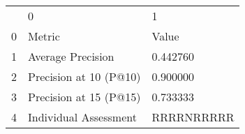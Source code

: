 \begin{tabular}{lll}
 & 0 & 1 \\
0 & Metric & Value \\
1 & Average Precision & 0.442760 \\
2 & Precision at 10 (P@10) & 0.900000 \\
3 & Precision at 15 (P@15) & 0.733333 \\
4 & Individual Assessment & RRRRNRRRRR \\
\end{tabular}
